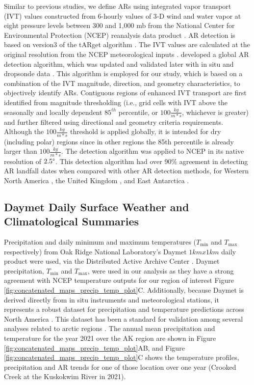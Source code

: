 \documentclass[12pts,draft]{AR_analysis_}
\begin{document}
Similar to previous studies, we define ARs using integrated vapor
transport (IVT) values constructed from 6-hourly values of 3‐D wind and
water vapor at eight pressure levels between 300 and 1,000
mb from the National Center for Environmental Protection (NCEP) 
reanalysis data product \cite{NCEP_NCAR_reanalysis}. 
AR detection is based on version3 of the tARget algorithm
\cite{Guan_Waliser2019, bin2022}.
The IVT values are calculated at the original
resolution from the NCEP
meteorological inputs \cite{NCEP_reanalysis}.
 developed a global
AR detection algorithm, which was updated and validated later with in
situ and dropsonde data \cite{bin2022}. This algorithm is employed for
our study, which is based on a combination of the IVT magnitude,
direction, and geometry characteristics, to objectively identify ARs.
Contiguous regions of enhanced IVT transport are first identified from
magnitude thresholding (i.e., grid cells with IVT above the seasonally
and locally dependent $85^{th}$ percentile, or $100\frac{kg}{m*s}$, 
whichever is greater) and further filtered
using directional and geometry criteria requirements. Although the 
$100\frac{kg}{m*s}$ threshold is applied globally, it is intended for 
dry (including polar) regions since in other regions the 85th percentile 
is already larger than $100\frac{kg}{m*s}$. The detection
algorithm was applied to NCEP in its native resolution of $2.5 \degree$.
This detection algorithm had over 90\% agreement in detecting AR
landfall dates when compared with other AR detection methods, for Western
North America \cite{Neiman2008}, the United Kingdom \cite{Lavers2011}, 
and East Antarctica \cite{Gorodetskaya2014}. 

\subsection{Daymet Daily Surface Weather and Climatological Summaries}

Precipitation and daily
minimum and maximum temperatures ($T_{\text{min}}$ and $T_{\text{max}}$ respectively) 
from Oak Ridge National
Laboratory's Daymet $1kmx1km$ daily product were used, via the
Distributed Active Archive Center \cite{daymet}. Daymet precipitation, 
$T_{\text{min}}$ and $T_{\text{max}}$, were used in our analysis as they
have a strong agreement with NCEP temperature outputs for our 
region of interest
Figure \ref{fig:concatenated_maps_precip_temp_plot}C. Additionally, 
because Daymet is derived directly from in situ instruments 
and meteorological stations, it represents a robust 
dataset for precipitation and temperature predictions across North
America \cite{daymet2021}. This dataset has been a standard for validation 
among several analyses related to arctic regions \cite{Diro2019, 
Akinsanola2024}. The annual mean precipitation and 
temperature for the year 2021 over the AK region are shown in Figure 
\ref{fig:concatenated_maps_precip_temp_plot}AB, and 
Figure \ref{fig:concatenated_maps_precip_temp_plot}C 
shows the temperature profiles, precipitation and AR trends
for one of those location over one year (Crooked 
Creek at the Kuskokwim River in 2021). 
\end{document}
